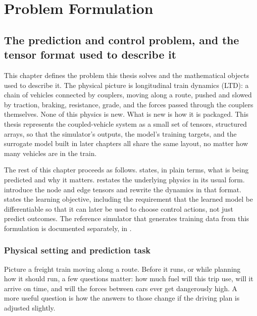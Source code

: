 \chapter{Problem Formulation}
\label{ch:problem}

\section{The prediction and control problem, and the tensor format used to describe it}
\label{sec:forecasting_tensor}

This chapter defines the problem this thesis solves and the mathematical objects used to describe it.
The physical picture is longitudinal train dynamics (LTD): a chain of vehicles connected by couplers, moving along a route, pushed and slowed by traction, braking, resistance, grade, and the forces passed through the couplers themselves.
None of this physics is new. What is new is how it is packaged. This thesis represents the coupled-vehicle system as a small set of tensors, structured arrays, so that the simulator's outputs, the model's training targets, and the surrogate model built in later chapters all share the same layout, no matter how many vehicles are in the train.

The rest of this chapter proceeds as follows.  states, in plain terms, what is being predicted and why it matters.  restates the underlying physics in its usual form.  introduce the node and edge tensors and rewrite the dynamics in that format.  states the learning objective, including the requirement that the learned model be differentiable so that it can later be used to choose control actions, not just predict outcomes. The reference simulator that generates training data from this formulation is documented separately, in .

\subsection{Physical setting and prediction task}
\label{sec:prediction_task}

Picture a freight train moving along a route. Before it runs, or while planning how it should run, a few questions matter: how much fuel will this trip use, will it arrive on time, and will the forces between cars ever get dangerously high. A more useful question is how the answers to those change if the driving plan is adjusted slightly.

